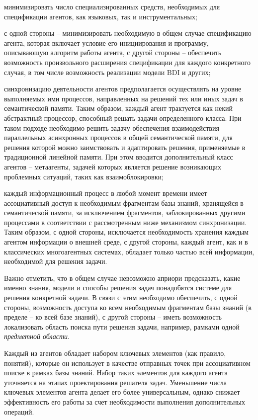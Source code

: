 \begin{textitemize}
	\begin{textitemize}
	\item минимизировать число специализированных средств, необходимых для спецификации агентов, как языковых, так и инструментальных;
	\item с одной стороны -- минимизировать необходимую в общем случае спецификацию агента, которая включает условие его инициирования и программу, описывающую алгоритм работы агента, с другой стороны -- обеспечить возможность произвольного расширения спецификации для каждого конкретного случая, в том числе возможность реализации модели BDI и других;
	\end{textitemize}
\item синхронизацию деятельности агентов предполагается осуществлять на уровне выполняемых ими процессов, направленных на решений тех или иных задач в семантической памяти. Таким образом, каждый агент трактуется как некий абстрактный процессор, способный решать задачи определенного класса. При таком подходе необходимо решить задачу обеспечения взаимодействия параллельных асинхронных процессов в общей семантической памяти, для решения которой можно заимствовать и адаптировать решения, применяемые в традиционной линейной памяти. При этом вводится дополнительный класс агентов -- метаагенты, задачей которых является решение возникающих проблемных ситуаций, таких как взаимоблокировки;
\item каждый информационный процесс в любой момент времени имеет ассоциативный доступ к необходимым фрагментам базы знаний, хранящейся в семантической памяти, за исключением фрагментов, заблокированных другими процессами в соответствии  с рассмотренным ниже механизмом синхронизации. Таким образом, с одной стороны, исключается необходимость хранения каждым агентом информации о внешней среде, с другой стороны, каждый агент, как и в классических многоагентных системах, обладает только частью всей информации, необходимой для решения задачи. 
	
Важно отметить, что в общем случае невозможно априори предсказать, какие именно знания, модели и способы решения задач понадобятся системе для решения конкретной задачи. В связи с этим необходимо обеспечить, с одной стороны, возможность доступа ко всем необходимым фрагментам базы знаний (в пределе -- ко всей базе знаний), с другой стороны -- иметь возможность локализовать область поиска пути решения задачи, например, рамками одной \textit{предметной области}.
	
Каждый из агентов обладает набором ключевых элементов (как правило, понятий), которые он использует в качестве отправных точек при ассоциативном поиске в рамках базы знаний. Набор таких элементов для каждого агента уточняется на этапах проектирования решателя задач. Уменьшение числа ключевых элементов агента делает его более универсальным, однако снижает эффективность его работы за счет необходимости выполнения дополнительных  операций.
\end{textitemize}

